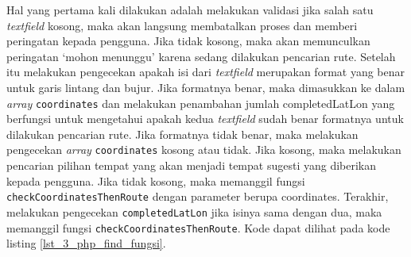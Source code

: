 Hal yang pertama kali dilakukan adalah melakukan validasi jika salah satu \textit{textfield} kosong, maka akan langsung membatalkan proses dan memberi peringatan kepada pengguna. Jika tidak kosong, maka akan memunculkan peringatan `mohon menunggu' karena sedang dilakukan pencarian rute. Setelah itu melakukan pengecekan apakah isi dari \textit{textfield} merupakan format yang benar untuk garis lintang dan bujur. Jika formatnya benar, maka dimasukkan ke dalam \textit{array} \verb!coordinates! dan melakukan penambahan jumlah  completedLatLon yang berfungsi untuk mengetahui apakah kedua \textit{textfield} sudah benar formatnya untuk dilakukan pencarian rute. Jika formatnya tidak benar, maka melakukan pengecekan \textit{array} \verb!coordinates! kosong atau tidak. 
Jika kosong, maka melakukan pencarian pilihan tempat yang akan menjadi tempat sugesti yang diberikan kepada pengguna. Jika tidak kosong, maka memanggil fungsi \verb!checkCoordinatesThenRoute! dengan parameter berupa coordinates. Terakhir, melakukan pengecekan \verb!completedLatLon! jika isinya sama dengan dua, maka memanggil fungsi \verb!checkCoordinatesThenRoute!. Kode dapat dilihat pada kode listing \ref{lst_3_php_find_fungsi}.

